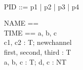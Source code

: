 \begin{zed}
 \\
 \also PID ::= p1 | p2 | p3 | p4\\
\end{zed}
\begin{circus}
	\circchannelset NAME == \lchanset \rchanset\\
	\circchannelset TIME == \lchanset a, b, c \rchanset\\
	\circchannel [T]c1, c2 : \power T; newchannel\\
	\circchannel first, second, third : T\\
	\circchannel a, b, c : T; d, c : NT
\end{circus}




